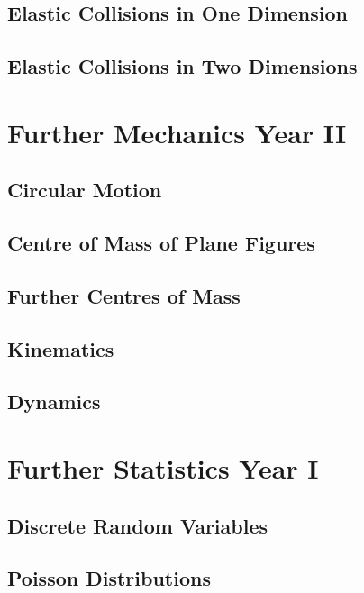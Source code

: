 \documentclass{book}
\begin{document}
    \section{Elastic Collisions in One Dimension} \label{elastic_collisions_in_one_dimension}
    \newpage
    \section{Elastic Collisions in Two Dimensions} \label{elastic_collisions_in_two_dimensions}
    \newpage

\chapter{Further Mechanics Year II} \label{ch:mechanics_ii}
    \section{Circular Motion} \label{circular_motions}
    \newpage
    \section{Centre of Mass of Plane Figures} \label{centre_of_mass_of_plane_figures}
    \newpage
    \section{Further Centres of Mass} \label{further_centres_of_mass}
    \newpage
    \section{Kinematics} \label{kinematics}
    \newpage
    \section{Dynamics} \label{dynamics}
    \newpage

\chapter{Further Statistics Year I} \label{ch:statistics_i}
    \section{Discrete Random Variables} \label{}
    \newpage
    \section{Poisson Distributions} \label{}
    \newpage
\end{document}

